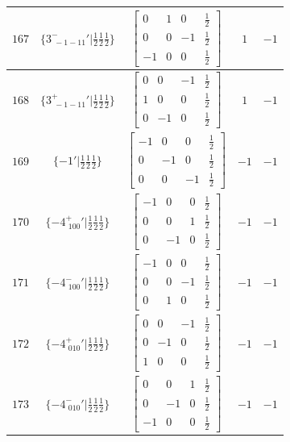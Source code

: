 \documentclass[fleqn,8pt]{jsarticle}
\begin{document}
\begin{longtable}{ccccc}
$ 167 $ & $ \{3^{-}_{\,\,-1-11}{}'|\frac{1}{2} \frac{1}{2} \frac{1}{2}\} $ & $ \begin{bmatrix} 0 & 1 & 0 & \frac{1}{2} \\ 0 & 0 & -1 & \frac{1}{2} \\ -1 & 0 & 0 & \frac{1}{2} \end{bmatrix} $ & $ 1 $ & $ -1 $ \\ \hline
$ 168 $ & $ \{3^{+}_{\,\,-1-11}{}'|\frac{1}{2} \frac{1}{2} \frac{1}{2}\} $ & $ \begin{bmatrix} 0 & 0 & -1 & \frac{1}{2} \\ 1 & 0 & 0 & \frac{1}{2} \\ 0 & -1 & 0 & \frac{1}{2} \end{bmatrix} $ & $ 1 $ & $ -1 $ \\ \hline
$ 169 $ & $ \{-1{}'|\frac{1}{2} \frac{1}{2} \frac{1}{2}\} $ & $ \begin{bmatrix} -1 & 0 & 0 & \frac{1}{2} \\ 0 & -1 & 0 & \frac{1}{2} \\ 0 & 0 & -1 & \frac{1}{2} \end{bmatrix} $ & $ -1 $ & $ -1 $ \\ \hline
$ 170 $ & $ \{-4^{+}_{\,\,100}{}'|\frac{1}{2} \frac{1}{2} \frac{1}{2}\} $ & $ \begin{bmatrix} -1 & 0 & 0 & \frac{1}{2} \\ 0 & 0 & 1 & \frac{1}{2} \\ 0 & -1 & 0 & \frac{1}{2} \end{bmatrix} $ & $ -1 $ & $ -1 $ \\ \hline
$ 171 $ & $ \{-4^{-}_{\,\,100}{}'|\frac{1}{2} \frac{1}{2} \frac{1}{2}\} $ & $ \begin{bmatrix} -1 & 0 & 0 & \frac{1}{2} \\ 0 & 0 & -1 & \frac{1}{2} \\ 0 & 1 & 0 & \frac{1}{2} \end{bmatrix} $ & $ -1 $ & $ -1 $ \\ \hline
$ 172 $ & $ \{-4^{+}_{\,\,010}{}'|\frac{1}{2} \frac{1}{2} \frac{1}{2}\} $ & $ \begin{bmatrix} 0 & 0 & -1 & \frac{1}{2} \\ 0 & -1 & 0 & \frac{1}{2} \\ 1 & 0 & 0 & \frac{1}{2} \end{bmatrix} $ & $ -1 $ & $ -1 $ \\ \hline
$ 173 $ & $ \{-4^{-}_{\,\,010}{}'|\frac{1}{2} \frac{1}{2} \frac{1}{2}\} $ & $ \begin{bmatrix} 0 & 0 & 1 & \frac{1}{2} \\ 0 & -1 & 0 & \frac{1}{2} \\ -1 & 0 & 0 & \frac{1}{2} \end{bmatrix} $ & $ -1 $ & $ -1 $ \\ \hline

\end{longtable}
\end{document}
